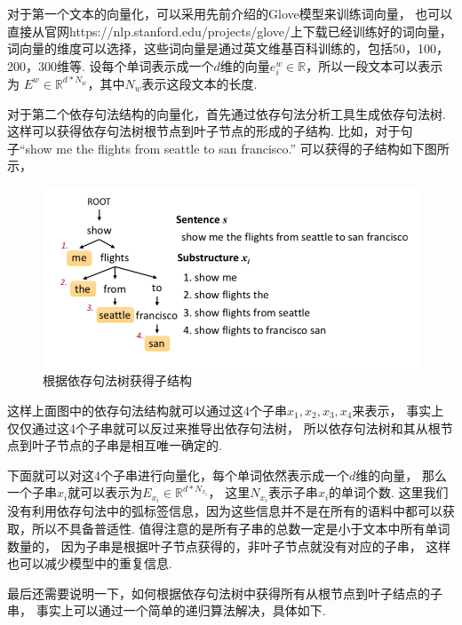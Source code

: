\documentclass[bachelor,winfonts]{jnuthesis}
\begin{document}
对于第一个文本的向量化，可以采用先前介绍的Glove模型来训练词向量，
也可以直接从官网https://nlp.stanford.edu/projects/glove/上下载已经训练好的词向量，
词向量的维度可以选择，这些词向量是通过英文维基百科训练的，包括50，100，200，300维等.
设每个单词表示成一个$d$维的向量$e_{i}^{w} \in \mathbb{R}$，所以一段文本可以表示为
$E^{w} \in \mathbb{R}^{d*N_{w}}$，其中$N_{w}$表示这段文本的长度.

对于第二个依存句法结构的向量化，首先通过依存句法分析工具生成依存句法树.
这样可以获得依存句法树根节点到叶子节点的形成的子结构.
比如，对于句子“show me the flights from seattle to san francisco.”
可以获得的子结构如下图所示，

\begin{figure}[h!]
  \centering
  \includegraphics[width=0.8\linewidth]{依存句法树举例.png}
  \caption{根据依存句法树获得子结构}
\end{figure}

这样上面图中的依存句法结构就可以通过这4个子串$x_{1},x_{2},x_{3},x_{4}$来表示，
事实上仅仅通过这4个子串就可以反过来推导出依存句法树，
所以依存句法树和其从根节点到叶子节点的子串是相互唯一确定的.

下面就可以对这4个子串进行向量化，每个单词依然表示成一个$d$维的向量，
那么一个子串$x_{i}$就可以表示为$E_{x_{i}} \in \mathbb{R}^{d*N_{x_{i}}}$，
这里$N_{x_{i}}$表示子串$x_{i}$的单词个数.
这里我们没有利用依存句法中的弧标签信息，因为这些信息并不是在所有的语料中都可以获取，所以不具备普适性.
值得注意的是所有子串的总数一定是小于文本中所有单词数量的，
因为子串是根据叶子节点获得的，非叶子节点就没有对应的子串，
这样也可以减少模型中的重复信息.

最后还需要说明一下，如何根据依存句法树中获得所有从根节点到叶子结点的子串，
事实上可以通过一个简单的递归算法解决，具体如下.
\end{document}
